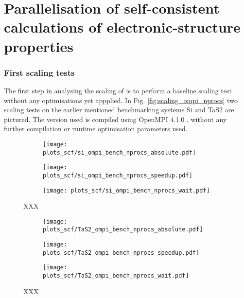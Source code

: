 \documentclass[main.tex]{subfiles}
\begin{document}
\chapter{Parallelisation of self-consistent calculations of electronic-structure properties\label{ch:optimisation_scf}}

\subsection{First scaling tests}

The first step in analysing the scaling of \QE is to perform a baseline scaling test without any optimisations yet appplied. 
In Fig. \ref{fig:scaling_ompi_nprocs} two scaling tests on the earlier mentioned benchmarking systems Si and TaS2 are pictured. 
The \QE version used is compiled using OpenMPI 4.1.0 , without any further compilation or runtime optimisation parameters used.

\begin{figure}[htbp]
\begin{subfigure}[b]{0.32\textwidth}
    \centering
    \texttt{[image: plots\_scf/si\_ompi\_bench\_nprocs\_absolute.pdf]}
\end{subfigure}
\begin{subfigure}[b]{0.32\textwidth}
    \centering
    \texttt{[image: plots\_scf/si\_ompi\_bench\_nprocs\_speedup.pdf]}
\end{subfigure}
\begin{subfigure}[b]{0.32\textwidth}
    \centering
    \texttt{[image: plots\_scf/si\_ompi\_bench\_nprocs\_wait.pdf]}
\end{subfigure}
\caption{XXX}
\label{fig:scaling_ompi_nprocs_si}
\end{figure}

\begin{figure}[h!]
\begin{subfigure}[b]{0.32\textwidth}
    \centering
    \texttt{[image: plots\_scf/TaS2\_ompi\_bench\_nprocs\_absolute.pdf]}
\end{subfigure}
\begin{subfigure}[b]{0.32\textwidth}
    \centering
    \texttt{[image: plots\_scf/TaS2\_ompi\_bench\_nprocs\_speedup.pdf]}
\end{subfigure}
\begin{subfigure}[b]{0.32\textwidth}
    \centering
    \texttt{[image: plots\_scf/TaS2\_ompi\_bench\_nprocs\_wait.pdf]}
\end{subfigure}
\caption{XXX}
\label{fig:scaling_ompi_nprocs_tas2}
\end{figure}
\end{document}
